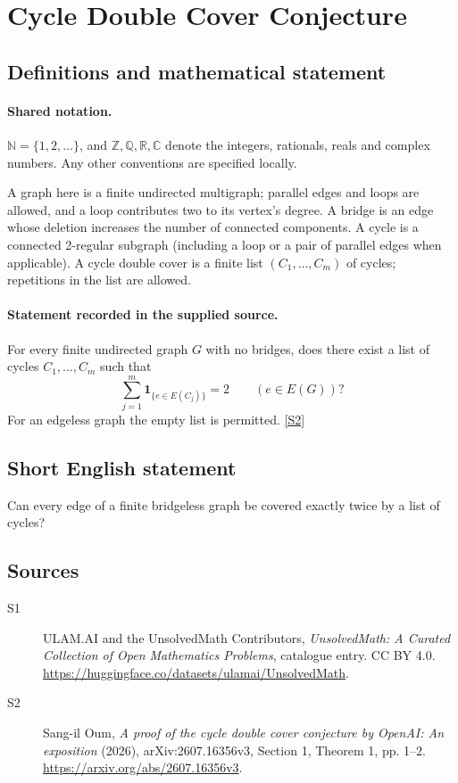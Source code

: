 \documentclass[11pt]{article}
\newcommand{\sref}[2]{\hyperlink{source:#1:#2}{[S#2]}}
\begin{document}
\section{Cycle Double Cover Conjecture}\label{statement}

\subsection{Definitions and mathematical statement}

\paragraph{Shared notation.}$\mathbb N=\{1,2,\ldots\}$, and $\mathbb Z,\mathbb Q,\mathbb R,\mathbb C$ denote the integers, rationals, reals and complex numbers. Any other conventions are specified locally.


A graph here is a finite undirected multigraph; parallel edges and loops are allowed, and a loop contributes two to its vertex's degree. A bridge is an edge whose deletion increases the number of connected components. A cycle is a connected 2-regular subgraph (including a loop or a pair of parallel edges when applicable). A cycle double cover is a finite list $(C_1,\ldots,C_m)$ of cycles; repetitions in the list are allowed.
\paragraph{Statement recorded in the supplied source.}
For every finite undirected graph $G$ with no bridges, does there exist a list of cycles $C_1,\ldots,C_m$ such that
\[
 \sum_{j=1}^{m}\mathbf 1_{\{e\in E(C_j)\}}=2\qquad(e\in E(G))?
\]
For an edgeless graph the empty list is permitted. \sref{statement}{2}
\subsection{Short English statement}
Can every edge of a finite bridgeless graph be covered exactly twice by a list of cycles?
\subsection{Sources}
\begin{description}
\item[\hypertarget{source:statement:1}{S1}] ULAM.AI and the UnsolvedMath Contributors, \emph{UnsolvedMath: A Curated Collection of Open Mathematics Problems}, catalogue entry. CC BY 4.0. \url{https://huggingface.co/datasets/ulamai/UnsolvedMath}.
\item[\hypertarget{source:statement:2}{S2}] Sang-il Oum, \emph{A proof of the cycle double cover conjecture by OpenAI: An exposition} (2026), arXiv:2607.16356v3, Section 1, Theorem 1, pp. 1--2. \url{https://arxiv.org/abs/2607.16356v3}.
\end{description}
\label{end:statement}
\end{document}
